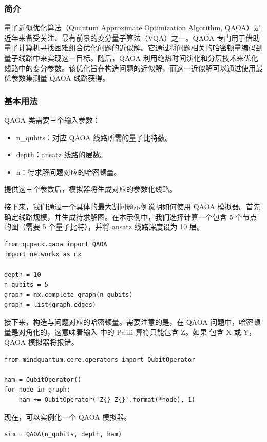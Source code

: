 
\subsubsection{简介}
量子近似优化算法（Quantum Approximate Optimization Algorithm, QAOA）是近年来备受关注、最有前景的变分量子算法（VQA）之一。QAOA 专门用于借助量子计算机寻找困难组合优化问题的近似解。它通过将问题相关的哈密顿量编码到量子线路中来实现这一目标。随后，QAOA 利用绝热时间演化和分层技术来优化线路中的变分参数。该优化旨在构造问题的近似解，而这一近似解可以通过使用最优参数集测量 QAOA 线路获得。

\subsubsection{基本用法}
QAOA 类需要三个输入参数：
\begin{itemize}
    \item n\_qubits：对应 QAOA 线路所需的量子比特数。
    \item depth：ansatz 线路的层数。
    \item h：待求解问题对应的哈密顿量。
\end{itemize}

提供这三个参数后，模拟器将生成对应的参数化线路。

接下来，我们通过一个具体的最大割问题示例说明如何使用 QAOA 模拟器。首先确定线路规模，并生成待求解图。在本示例中，我们选择计算一个包含 5 个节点的图（需要 5 个量子比特），并将 ansatz 线路深度设为 10 层。

\begin{lstlisting}
from qupack.qaoa import QAOA
import networkx as nx

depth = 10
n_qubits = 5
graph = nx.complete_graph(n_qubits)
graph = list(graph.edges)
\end{lstlisting}

接下来，构造与问题对应的哈密顿量。需要注意的是，在 QAOA 问题中，哈密顿量是对角化的，这意味着输入  中的 Pauli 算符只能包含 Z。如果  包含 X 或 Y，QAOA 模拟器将报错。

\begin{lstlisting}
from mindquantum.core.operators import QubitOperator

ham = QubitOperator()
for node in graph:
    ham += QubitOperator('Z{} Z{}'.format(*node), 1)
\end{lstlisting}

现在，可以实例化一个 QAOA 模拟器。
\begin{lstlisting}
sim = QAOA(n_qubits, depth, ham)
\end{lstlisting}

